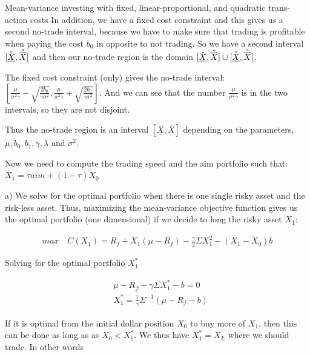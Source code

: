\documentclass[10pt]{article}
\newenvironment{exercise}[2][Exercise]{\begin{trivlist}
  \item[\hskip \labelsep {\bfseries #1}\hskip \labelsep {\bfseries #2.}]}{\end{trivlist}}
\begin{document}
\begin{exercise}{1}{Mean-variance investing with fixed, linear-proportional, and quadratic trans- action costs}
  In addition, we have a fixed cost constraint and this gives us a second no-trade interval, because we have to make sure that trading is profitable when paying the cost $b_0$ in opposite to not trading. So we have a second interval $[\accentset{\circ}{\underline{X}},\accentset{\circ}{\overline{X}}]$ and then our no-trade region is the domain $ [\tilde{\underline{X}},\tilde{\overline{X}}]\cup [\accentset{\circ}{\underline{X}},\accentset{\circ}{\overline{X}}]$. 

  The fixed cost constraint (only) gives the no-trade interval: $[\frac{\mu}{\sigma^2\gamma} -\sqrt{\frac{2b_0}{\gamma\sigma^2}},\frac{\mu}{\sigma^2\gamma} +\sqrt{\frac{2b_0}{\gamma\sigma^2}}]$. And we can see that the number $\frac{\mu}{\sigma^2\gamma}$ is in the two intervals, so they are not disjoint. 
  
  Thus the no-trade region is an interval $[\underline{X},\overline{X}]$ depending on the parameters, $\mu, b_0, b_1,\gamma, \lambda$ and $\sigma^2$. 

  Now we need to compute the trading speed and the aim portfolio such that: $X_1 = \tau aim + (1-\tau)X_0$

\end{exercise}

\newpage

\begin{exercise}{2}
\end{exercise}

a) We solve for the optimal portfolio when there is one single risky asset and the risk-less asset. Thus, maximizing the mean-variance objective function gives us the optimal portfolio (one dimensional) if we decide to long the risky asset $X_1$:

\begin{align*}
	max \quad C(X_1) = R_f + X_1(\mu - R_f) - \frac{\gamma}{2} \Sigma X_1^2 - (X_1 - X_0)b
\end{align*}

Solving for the optimal portfolio $X_1^*$ 

\begin{align*}
	& \mu - R_f - \gamma \Sigma X_1^* - b = 0 \\
	& X_1^* = \frac{1}{\gamma} \Sigma^{-1} (\mu - R_f  - b)
\end{align*}

If it is optimal from the initial dollar position $X_0$ to buy more of $X_1$, then this can be done as long as as $X_0 < X_1^*$. We thus have $X_1^* = X_L$ where we should trade. In other words
\end{document}
